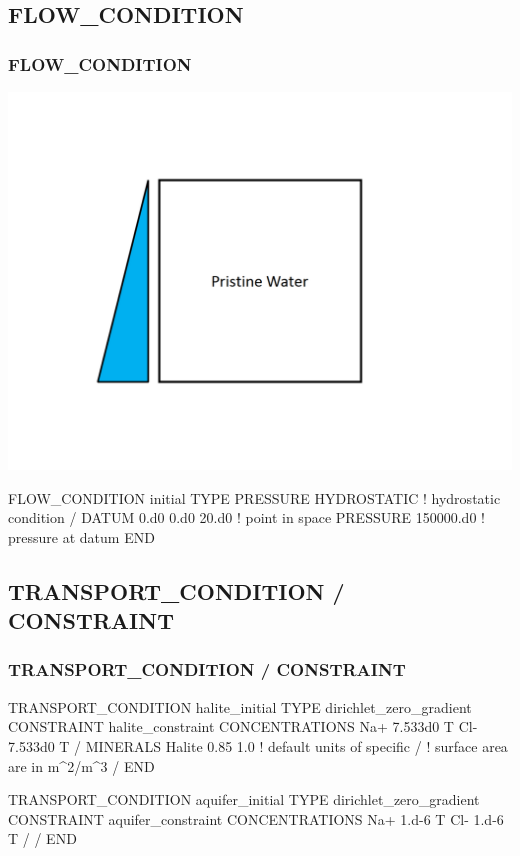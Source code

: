 \documentclass{beamer}
\newcommand\bluecomment[1]{{{\color{blue} #1}}}
\begin{document}
\subsection{FLOW\_CONDITION}

\begin{frame}[fragile]\frametitle{FLOW\_CONDITION}

\centering
\includegraphics[width=0.35\linewidth]{./density_dependent_hydrostatic_fig}

\begin{semiverbatim}
FLOW_CONDITION initial
  TYPE
    PRESSURE HYDROSTATIC  \bluecomment{! hydrostatic condition}
  /
  DATUM 0.d0 0.d0 20.d0   \bluecomment{! point in space}
  PRESSURE 150000.d0      \bluecomment{! pressure at datum}
END
\end{semiverbatim}
\end{frame}

\subsection{TRANSPORT\_CONDITION / CONSTRAINT}

\begin{frame}\frametitle{TRANSPORT\_CONDITION / CONSTRAINT}

{
\begin{semiverbatim}

TRANSPORT_CONDITION halite_initial
  TYPE dirichlet_zero_gradient
  CONSTRAINT halite_constraint
    CONCENTRATIONS
      Na+ 7.533d0  T
      Cl- 7.533d0  T
    /
    MINERALS
      Halite 0.85 1.0    \bluecomment{! default units of specific}
    /                    \bluecomment{! surface area are in m^2/m^3}
  /
END

\newpage
TRANSPORT_CONDITION aquifer_initial
  TYPE dirichlet_zero_gradient
  CONSTRAINT aquifer_constraint
    CONCENTRATIONS
      Na+ 1.d-6  T
      Cl- 1.d-6  T    
    /
  /
END
\end{semiverbatim}
}

\end{frame}
\end{document}
